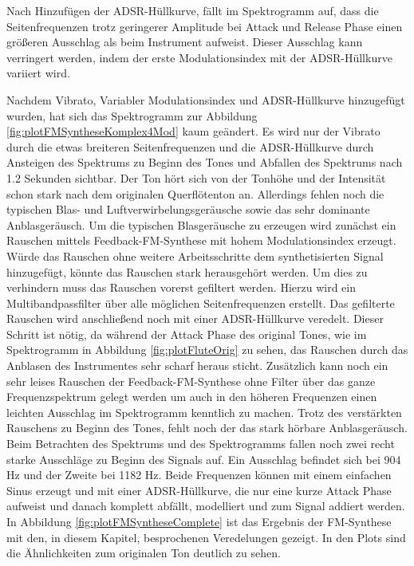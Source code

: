 Nach Hinzufügen der ADSR-Hüllkurve, fällt im Spektrogramm auf, dass die Seitenfrequenzen trotz geringerer Amplitude bei Attack und Release Phase einen größeren Ausschlag als beim Instrument aufweist. Dieser Ausschlag kann verringert werden, indem der erste Modulationsindex mit der ADSR-Hüllkurve variiert wird. 

Nachdem Vibrato, Variabler Modulationsindex und ADSR-Hüllkurve hinzugefügt wurden, hat sich das Spektrogramm zur Abbildung \ref{fig:plotFMSyntheseKomplex4Mod} kaum geändert. Es wird nur der Vibrato durch die etwas breiteren Seitenfrequenzen und die ADSR-Hüllkurve durch Ansteigen des Spektrums zu Beginn des Tones und Abfallen des Spektrums nach 1.2 Sekunden sichtbar. Der Ton hört sich von der Tonhöhe und der Intensität schon stark nach dem originalen Querflötenton an. Allerdings fehlen noch die typischen Blas- und Luftverwirbelungsgeräusche sowie das sehr dominante Anblasgeräusch. Um die typischen Blasgeräusche zu erzeugen wird zunächst ein Rauschen mittels Feedback-FM-Synthese mit hohem Modulationsindex erzeugt. Würde das Rauschen ohne weitere Arbeitsschritte dem synthetisierten Signal hinzugefügt, könnte das Rauschen stark herausgehört werden. Um dies zu verhindern muss das Rauschen vorerst gefiltert werden. Hierzu wird ein Multibandpassfilter über alle möglichen Seitenfrequenzen erstellt. Das gefilterte Rauschen wird anschließend noch mit einer ADSR-Hüllkurve veredelt. Dieser Schritt ist nötig, da während der Attack Phase des original Tones, wie im Spektrogramm in Abbildung \ref{fig:plotFluteOrig} zu sehen, das Rauschen durch das Anblasen des Instrumentes sehr scharf heraus sticht. Zusätzlich kann noch ein sehr leises Rauschen der Feedback-FM-Synthese ohne Filter über das ganze Frequenzspektrum gelegt werden um auch in den höheren Frequenzen einen leichten Ausschlag im Spektrogramm kenntlich zu machen. Trotz des verstärkten Rauschens zu Beginn des Tones, fehlt noch der das stark hörbare Anblasgeräusch. Beim Betrachten des Spektrums und des Spektrogramms fallen noch zwei recht starke Ausschläge zu Beginn des Signals auf. Ein Ausschlag befindet sich bei 904 Hz und der Zweite bei 1182 Hz. Beide Frequenzen können mit einem einfachen Sinus erzeugt und mit einer ADSR-Hüllkurve, die nur eine kurze Attack Phase aufweist und danach komplett abfällt, modelliert und zum Signal addiert werden. In Abbildung \ref{fig:plotFMSyntheseComplete} ist das Ergebnis der FM-Synthese mit den, in diesem Kapitel, besprochenen Veredelungen gezeigt. In den Plots sind die Ähnlichkeiten zum originalen Ton deutlich zu sehen.

